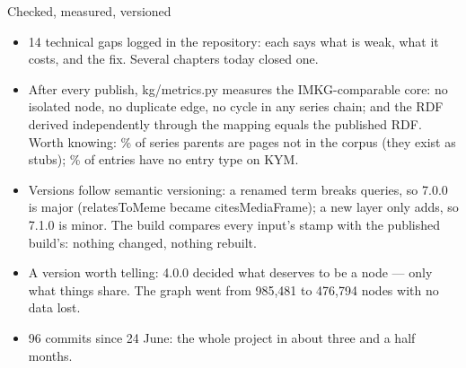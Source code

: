 \begin{frame}{Checked, measured, versioned}
{\begin{itemize}
    \item 14 technical gaps logged in the repository: each says what is weak, what it costs, and the
      fix. Several chapters today closed one.
    \item After every publish, kg/metrics.py measures the IMKG-comparable core: no isolated node, no
      duplicate edge, no cycle in any series chain; and the RDF derived independently through the
      mapping equals the published RDF. Worth knowing: \NUnresolvedPct\% of series parents are pages not
      in the corpus (they exist as stubs); \NNoTypePct\% of entries have no entry type on KYM.
    \item Versions follow semantic versioning: a renamed term breaks queries, so 7.0.0 is major
      (relatesToMeme became citesMediaFrame); a new layer only adds, so 7.1.0 is minor. The build
      compares every input's stamp with the published build's: nothing changed, nothing rebuilt.
    \item A version worth telling: 4.0.0 decided what deserves to be a node --- only what things
      share. The graph went from 985,481 to 476,794 nodes with no data lost.
    \item 96 commits since 24 June: the whole project in about three and a half months.
  \end{itemize}}
\end{frame}
